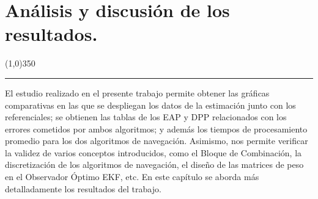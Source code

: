 \documentclass[10pt]{report}
\numberwithin{equation}{chapter}
\numberwithin{algorithm}{chapter}
\begin{document}
\chapter{Análisis y discusión de los resultados.}
\begin{center}
\line(1,0){350}\\\rule[-.4\baselineskip]{1.0\linewidth}{3.2pt}
\end{center}
El estudio realizado en el presente trabajo permite obtener las gráficas comparativas en las que se despliegan los datos de la estimación junto con los referenciales; se obtienen las tablas de los EAP y DPP relacionados con los errores cometidos por ambos algoritmos; y además los tiempos de procesamiento promedio para los dos algoritmos de navegación. Asimismo, nos permite verificar la validez de varios conceptos introducidos, como el Bloque de Combinación, la discretización de los algoritmos de navegación, el diseño de las matrices de peso en el Observador Óptimo EKF, etc. En este capítulo se aborda más detalladamente los resultados del trabajo.\par
\end{document}
